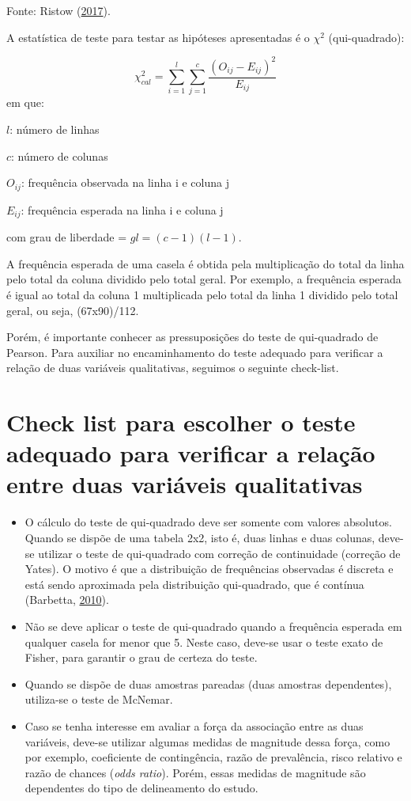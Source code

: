 \documentclass[12pt,brazil,oneside]{book}
\begin{document}
Fonte: Ristow (\protect\hyperlink{ref-Ristow2017}{2017}).

A estatística de teste para testar as hipóteses apresentadas é o \(\chi^2\) (qui-quadrado):

\[
\chi^2_{cal}=\sum_{i=1}^{l}\sum_{j=1}^{c}\frac{(O_{ij}-E_{ij})^2}{E_{ij}}
\]
em que:

\(l\): número de linhas

\(c\): número de colunas

\(O_{ij}\): frequência observada na linha i e coluna j

\(E_{ij}\): frequência esperada na linha i e coluna j

com grau de liberdade = \(gl = (c-1)(l-1)\).

A frequência esperada de uma casela é obtida pela multiplicação do total da linha pelo total da coluna dividido pelo total geral. Por exemplo, a frequência esperada é igual ao total da coluna 1 multiplicada pelo total da linha 1 dividido pelo total geral, ou seja, (67x90)/112.

Porém, é importante conhecer as pressuposições do teste de qui-quadrado de Pearson. Para auxiliar no encaminhamento do teste adequado para verificar a relação de duas variáveis qualitativas, seguimos o seguinte check-list.

\hypertarget{check-list-para-escolher-o-teste-adequado-para-verificar-a-relacao-entre-duas-variaveis-qualitativas}{%
\section{Check list para escolher o teste adequado para verificar a relação entre duas variáveis qualitativas}\label{check-list-para-escolher-o-teste-adequado-para-verificar-a-relacao-entre-duas-variaveis-qualitativas}}

\begin{itemize}
\item
  O cálculo do teste de qui-quadrado deve ser somente com valores absolutos. Quando se dispõe de uma tabela 2x2, isto é, duas linhas e duas colunas, deve-se utilizar o teste de qui-quadrado com correção de continuidade (correção de Yates). O motivo é que a distribuição de frequências observadas é discreta e está sendo aproximada pela distribuição qui-quadrado, que é contínua (Barbetta, \protect\hyperlink{ref-barbetta1988}{2010}).
\item
  Não se deve aplicar o teste de qui-quadrado quando a frequência esperada em qualquer casela for menor que 5. Neste caso, deve-se usar o teste exato de Fisher, para garantir o grau de certeza do teste.
\item
  Quando se dispõe de duas amostras pareadas (duas amostras dependentes), utiliza-se o teste de McNemar.
\item
  Caso se tenha interesse em avaliar a força da associação entre as duas variáveis, deve-se utilizar algumas medidas de magnitude dessa força, como por exemplo, coeficiente de contingência, razão de prevalência, risco relativo e razão de chances (\emph{odds ratio}). Porém, essas medidas de magnitude são dependentes do tipo de delineamento do estudo.
\end{itemize}
\end{document}
